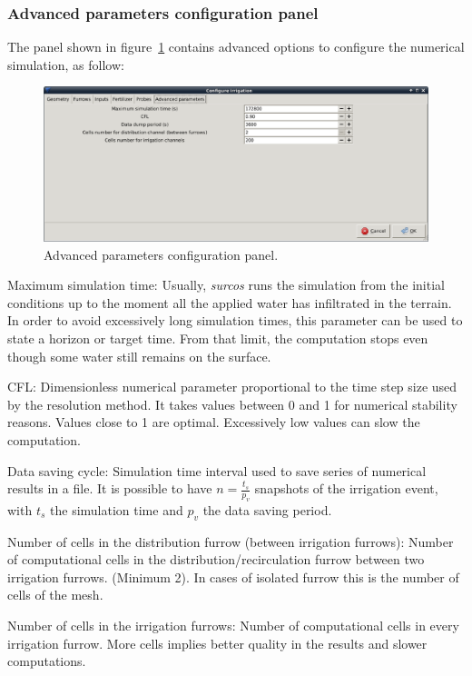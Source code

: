 \documentclass[review,authoryear]{elsarticle}
\begin{document}
\subsubsection{Advanced parameters configuration panel}

The panel shown in figure~\ref{param} contains advanced options to configure
the numerical simulation, as follow:

\begin{figure}[!ht]
\begin{center}
\includegraphics[width=1125\UNIT]{confParamEN.eps}
\caption{Advanced parameters configuration panel.}\label{param}
\end{center}
\end{figure}

\begin{description}
\item{Maximum simulation time}: Usually, \emph{surcos} runs the
simulation from the initial conditions up to the moment all the applied water
has infiltrated in the terrain. In order to avoid excessively long simulation
times, this parameter can be used to state a horizon or target time. From that
limit, the computation stops even though some water still remains on the
surface.
\item{CFL}: Dimensionless numerical parameter proportional to the time step size
used by the resolution method. It takes values between 0 and 1 for numerical
stability reasons. Values close to 1 are optimal. Excessively low values can
slow the computation.
\item{Data saving cycle}: Simulation time interval used to save series of
numerical results in a file. It is possible to have $n=\frac{t_s}{p_v}$
snapshots of the irrigation event, with $t_s$ the simulation time and $p_v$ the
data saving period.  
\item{Number of cells in the distribution furrow (between irrigation furrows)}:
Number of computational cells in the distribution/recirculation furrow between
two irrigation furrows. (Minimum 2). In cases of isolated furrow this is the
number of cells of the mesh.
\item{Number of cells in the irrigation furrows}: Number of computational cells
in every irrigation furrow. More cells implies better quality in the results and
slower computations.
\end{description}
\end{document}
